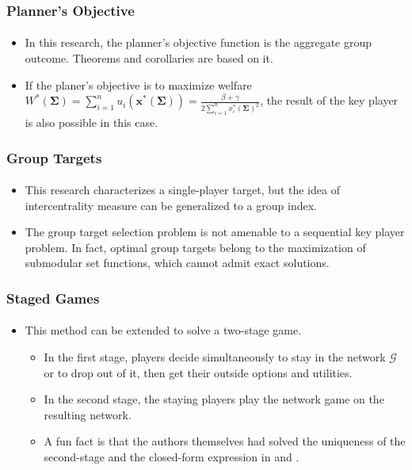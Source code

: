 \documentclass{beamer}
\newcommand{\eug}{\mathscr{G}}
\newcommand{\Ne}{\text{Nash equilibrium }}
\begin{document}
\begin{frame}[label=current]
    \frametitle{Planner's Objective}
    \framesubtitle{}
    \begin{itemize}
        \item In this research, the planner's objective function is the aggregate group outcome.
            Theorems and corollaries are based on it.
        \item If the planer's objective is to maximize welfare
            $W^*(\bm{\Sigma})=\sum_{i=1}^nu_i(\bm{x}^*(\bm{\Sigma}))=\frac{\beta+\gamma}{2\sum_{i=1}^n
            x_i^*(\bm{\Sigma})^2}$, the result of the key player is also possible in this case.
    \end{itemize}
\end{frame}

\begin{frame}[label=current]
    \frametitle{Group Targets}
    \framesubtitle{}
    \begin{itemize}
        \item This research characterizes a single-player target, but the idea of
            intercentrality measure can be generalized to a group index.
        \item The group target selection problem is not amenable to a sequential key
            player problem. In fact, optimal group targets belong to the maximization of
            submodular set functions, which cannot admit exact solutions.
    \end{itemize}
\end{frame}

\begin{frame}[label=current]
    \frametitle{Staged Games}
    \framesubtitle{}
    \begin{itemize}
        \item This method can be extended to solve a two-stage game.
            \begin{itemize}
                \item In the first stage, players decide simultaneously to stay in the network
                    $\eug$ or to drop out of it, then get their outside options and utilities.
                \item In the second stage, the staying players play the network game on the 
                    resulting network.
                \item A fun fact is that 
                    the authors themselves had solved the uniqueness of the second-stage
                    \Ne and the closed-form expression in \citet{author1} and \citet{author2}.
            \end{itemize}
    \end{itemize}
\end{frame}

\begin{frame}[allowframebreaks]
    
\end{frame}
\end{document}
